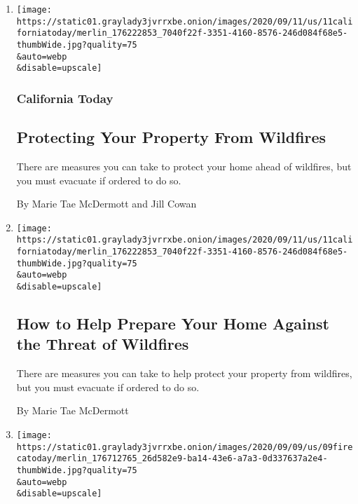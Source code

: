\begin{enumerate}
\def\labelenumi{\arabic{enumi}.}
\item
  \href{/2020/09/11/us/how-to-protect-property-from-wildfires.html}{}

  \texttt{[image: https://static01.graylady3jvrrxbe.onion/images/2020/09/11/us/11californiatoday/merlin\_176222853\_7040f22f-3351-4160-8576-246d084f68e5-thumbWide.jpg?quality=75\\\&auto=webp\\\&disable=upscale]}

  \hypertarget{california-today}{%
  \subsubsection{California Today}\label{california-today}}

  \hypertarget{protecting-your-property-from-wildfires}{%
  \subsection{Protecting Your Property From
  Wildfires}\label{protecting-your-property-from-wildfires}}

  There are measures you can take to protect your home ahead of
  wildfires, but you must evacuate if ordered to do so.

  By Marie Tae McDermott and Jill Cowan
\item
  \href{/2020/09/10/us/wildfires-protection.html}{}

  \texttt{[image: https://static01.graylady3jvrrxbe.onion/images/2020/09/11/us/11californiatoday/merlin\_176222853\_7040f22f-3351-4160-8576-246d084f68e5-thumbWide.jpg?quality=75\\\&auto=webp\\\&disable=upscale]}

  \hypertarget{how-to-help-prepare-your-home-against-the-threat-of-wildfires}{%
  \subsection{How to Help Prepare Your Home Against the Threat of
  Wildfires}\label{how-to-help-prepare-your-home-against-the-threat-of-wildfires}}

  There are measures you can take to help protect your property from
  wildfires, but you must evacuate if ordered to do so.

  By Marie Tae McDermott
\item
  \href{/2020/09/09/us/california-wildfires.html}{}

  \texttt{[image: https://static01.graylady3jvrrxbe.onion/images/2020/09/09/us/09firecatoday/merlin\_176712765\_26d582e9-ba14-43e6-a7a3-0d337637a2e4-thumbWide.jpg?quality=75\\\&auto=webp\\\&disable=upscale]}


\end{enumerate}
